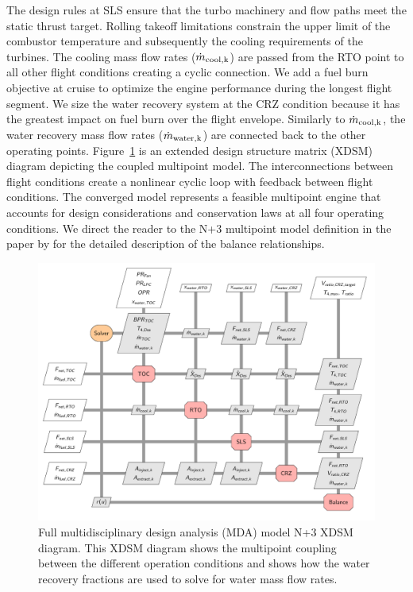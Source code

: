 \documentclass[conf]{new-aiaa}
\begin{document}
The design rules at SLS ensure that the turbo machinery and flow paths meet the static thrust target.
Rolling takeoff limitations constrain the upper limit of the combustor temperature and subsequently the cooling requirements of the turbines.
The cooling mass flow rates ($\dot{m}_{\rm{cool},k}$) are passed from the RTO point to all other flight conditions creating a cyclic connection.
We add a fuel burn objective at cruise to optimize the engine performance during the longest flight segment.
We size the water recovery system at the CRZ condition because it has the greatest impact on fuel burn over the flight envelope.
Similarly to $\dot{m}_{\rm{cool},k}$, the water recovery mass flow rates ($\dot{m}_{\rm{water},k}$) are connected back to the other operating points.
Figure~\ref{fig:N3_xdsm_full} is an extended design structure matrix (XDSM)~\cite{Lambe2012a} diagram depicting the coupled multipoint model.
The interconnections between flight conditions create a nonlinear cyclic loop with feedback between flight conditions.
The converged model represents a feasible multipoint engine that accounts for design considerations and conservation laws at all four operating conditions.
We direct the reader to the N+3 multipoint model definition in the paper by \citet{Hendricks2019} for the detailed description of the balance relationships.

\begin{figure}[hbt!]
  \centering
  \includegraphics[width=\textwidth]{N3_xdsm_full.pdf}
  \caption{
    Full multidisciplinary design analysis (MDA) model N+3 XDSM diagram.
    This XDSM diagram shows the multipoint coupling between the different operation conditions and shows how the water recovery fractions are used to solve for water mass flow rates.
  }
  \label{fig:N3_xdsm_full}
\end{figure}
\end{document}
